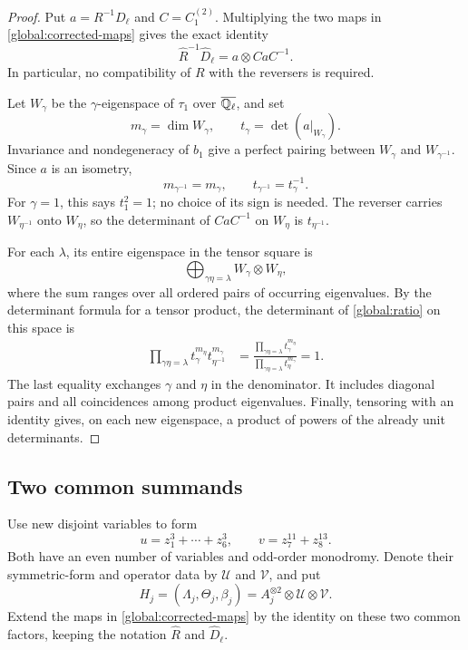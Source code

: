 \begin{proof}
Put $a=R^{-1}D_\ell$ and $C=C_1^{(2)}$.  Multiplying the two maps in
\eqref{global:corrected-maps} gives the exact identity
\begin{equation}
\label{global:ratio}
 \widehat R^{-1}\widehat D_\ell=a\otimes CaC^{-1}.
\end{equation}
In particular, no compatibility of $R$ with the reversers is required.

Let $W_\gamma$ be the $\gamma$-eigenspace of $\tau_1$ over
$\overline{\mathbb Q_\ell}$, and set
\[
 m_\gamma=\dim W_\gamma,
 \qquad t_\gamma=\det(a|_{W_\gamma}).
\]
Invariance and nondegeneracy of $b_1$ give a perfect pairing between
$W_\gamma$ and $W_{\gamma^{-1}}$.  Since $a$ is an isometry,
\begin{equation}
\label{global:inverse-determinants}
 m_{\gamma^{-1}}=m_\gamma,
 \qquad t_{\gamma^{-1}}=t_\gamma^{-1}.
\end{equation}
For $\gamma=1$, this says $t_1^2=1$; no choice of its sign is needed.
The reverser carries $W_{\eta^{-1}}$ onto $W_\eta$, so the determinant
of $CaC^{-1}$ on $W_\eta$ is $t_{\eta^{-1}}$.

For each $\lambda$, its entire eigenspace in the tensor square is
\[
 \bigoplus_{\gamma\eta=\lambda}W_\gamma\otimes W_\eta,
\]
where the sum ranges over all ordered pairs of occurring eigenvalues.
By the determinant formula for a tensor product, the determinant of
\eqref{global:ratio} on this space is
\begin{align*}
 \prod_{\gamma\eta=\lambda}
       t_\gamma^{m_\eta}t_{\eta^{-1}}^{m_\gamma}
 &=
 \frac{\displaystyle\prod_{\gamma\eta=\lambda}t_\gamma^{m_\eta}}
      {\displaystyle\prod_{\gamma\eta=\lambda}t_\eta^{m_\gamma}}
 =1.
\end{align*}
The last equality exchanges $\gamma$ and $\eta$ in the denominator.
It includes diagonal pairs and all coincidences among product
eigenvalues.  Finally, tensoring with an identity gives, on each new
eigenspace, a product of powers of the already unit determinants.
\end{proof}

\subsection{Two common summands}

Use new disjoint variables to form
\begin{equation}
\label{global:common-polynomials}
 u=z_1^3+\cdots+z_6^3,
 \qquad v=z_7^{11}+z_8^{13}.
\end{equation}
Both have an even number of variables and odd-order monodromy.  Denote
their symmetric-form and operator data by $\mathcal U$ and
$\mathcal V$, and put
\begin{equation}
\label{global:final-data}
 H_j=(\Lambda_j,\Theta_j,\beta_j)
     =A_j^{\otimes2}\otimes\mathcal U\otimes\mathcal V.
\end{equation}
Extend the maps in \eqref{global:corrected-maps} by the identity on
these two common factors, keeping the notation $\widehat R$ and
$\widehat D_\ell$.

